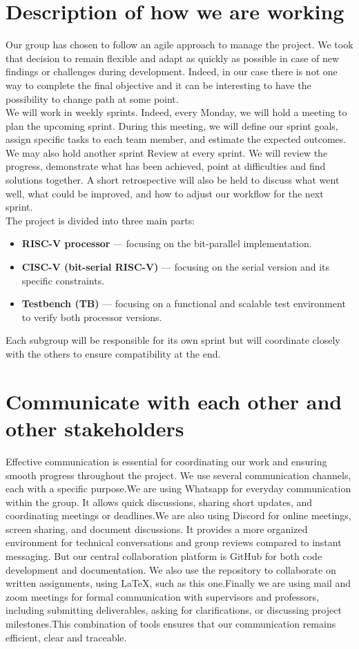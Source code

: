 \documentclass[10pt,twocolumn]{article}
\begin{document}
\section{Description of how we are working}
Our group has chosen to follow an agile approach to manage the project. We took that decision to remain flexible and adapt as quickly as possible in case of new findings or challenges during development. Indeed, in our case there is not one way to complete the final objective and it can be interesting to have the possibility to change path at some point.\\
We will work in weekly sprints. Indeed, every Monday, we will hold a meeting to plan the upcoming sprint. During this meeting, we will define our sprint goals, assign specific tasks to each team member, and estimate the expected outcomes.\\
We may also hold another sprint Review at every sprint. We will review the progress, demonstrate what has been achieved, point at difficulties and find solutions together. A short retrospective will also be held to discuss what went well, what could be improved, and how to adjust our workflow for the next sprint.\\
The project is divided into three main parts:

\begin{itemize}
  \item \textbf{RISC-V processor} — focusing on the bit-parallel implementation.
  \item \textbf{CISC-V (bit-serial RISC-V)} — focusing on the serial version and its specific constraints.
  \item \textbf{Testbench (TB)} — focusing on a functional and scalable test environment to verify both processor versions.
\end{itemize}
Each subgroup will be responsible for its own sprint but will coordinate closely with the others to ensure compatibility at the end.


\section{Communicate with each other and other stakeholders}
Effective communication is essential for coordinating our work and ensuring smooth progress throughout the project. We use several communication channels, each with a specific purpose.We are using Whatsapp for everyday communication within the group. It allows quick discussions, sharing short updates, and coordinating meetings or deadlines.We are also using Discord for online meetings, screen sharing, and document discussions. It provides a more organized environment for technical conversations and group reviews compared to instant messaging.
But our central collaboration platform is GitHub for both code development and documentation. We also use the repository to collaborate on written assignments, using LaTeX, such as this one.Finally we are using mail and zoom meetings for formal communication with supervisors and professors, including submitting deliverables, asking for clarifications, or discussing project milestones.This combination of tools ensures that our communication remains efficient, clear and traceable.
\end{document}
